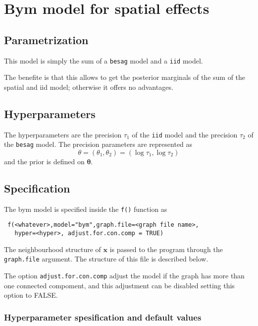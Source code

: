 \documentclass[a4paper,11pt]{article}
\begin{document}
\section*{Bym model for spatial effects}

\subsection*{Parametrization}

This model is simply the sum of a \lstinline$besag$ model and a
\lstinline$iid$ model.
 
The benefite is that this allows to get the posterior marginals of the
sum of the spatial and iid model; otherwise it offers no advantages.

\subsection*{Hyperparameters}
The hyperparameters are the precision $\tau_1$ of the \lstinline$iid$
model and the precision $\tau_2$ of the \lstinline$besag$ model.  The
precision parameters are represented as
\begin{displaymath}
    \theta=(\theta_1,\theta_2) =(\log \tau_1,\log \tau_2)
\end{displaymath}
and the prior is defined on $\mathbf{\theta}$.

\subsection*{Specification}

The bym model is specified inside the {\tt f()} function as
\begin{verbatim}
 f(<whatever>,model="bym",graph.file=<graph file name>,
   hyper=<hyper>, adjust.for.con.comp = TRUE)
\end{verbatim}

The neighbourhood structure of $\mathbf{x}$ is passed to the program
through the {\tt graph.file} argument.  The structure of this file is
described below.

The option \verb|adjust.for.con.comp| adjust the model if the graph
has more than one connected compoment, and this adjustment can be
disabled setting this option to FALSE.

\subsubsection*{Hyperparameter spesification and default values}

\end{document}
